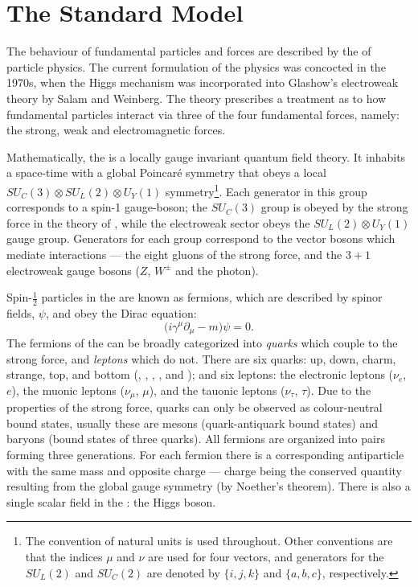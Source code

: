 \section{The Standard Model}
\label{sec:sm}
The behaviour of fundamental particles and forces are described by the \sm of
particle physics.
The current formulation of the \sm physics was concocted in the 1970s, when the Higgs
mechanism was incorporated into Glashow's electroweak theory by Salam and Weinberg.
The theory prescribes a treatment
as to how fundamental particles interact via three of the four
fundamental forces, namely: the strong, weak and electromagnetic forces.

Mathematically, the \sm is a locally gauge invariant quantum field theory.
It inhabits a space-time with a global Poincar\'e symmetry that obeys a local
$SU_C(3)\otimes SU_L(2)\otimes U_Y(1)$ symmetry\footnote{
The convention of natural units is used throughout.
Other conventions are that the indices $\mu$ and $\nu$ are used for four vectors, and generators
for the $SU_L(2)$ and $SU_C(2)$ are denoted by $\{i,j,k\}$ and $\{a,b,c\}$, respectively.}.
Each generator in this group corresponds to a spin-1 gauge-boson;
the $SU_C(3)$ group is obeyed by the strong force in the theory of \QCD,
while the electroweak sector obeys the $SU_L(2)\otimes U_Y(1)$ gauge group.
Generators for each group correspond to the vector bosons which mediate
interactions --- the eight gluons of the strong force, and the $3+1$ electroweak gauge bosons ($Z$,
$W^\pm$ and the photon).

Spin-$\tfrac12$ particles in the \sm are known as fermions,
which are described by spinor fields, $\psi$, and obey the Dirac equation:
\begin{equation}
  \big(i\gamma^\mu\partial_\mu - m\big)\psi = 0.
  \label{th:eq:dirac}
\end{equation}
The fermions of the \sm can be broadly categorized into \emph{quarks} which couple to the strong
force, and \emph{leptons} which do not.
There are six quarks: up, down, charm, strange, top, and bottom (\uquark, \dquark, \cquark,
\squark, \tquark and \bquark); and six leptons:
the electronic leptons ($\nu_e$, $e$),
the muonic leptons ($\nu_\mu$, $\mu$),
and the tauonic leptons ($\nu_\tau$, $\tau$).
Due to the properties of the strong force, quarks can only be observed as colour-neutral bound
states, usually these are
mesons (quark-antiquark bound states) and baryons (bound states of three quarks).
All fermions are organized into pairs forming three generations.
For each fermion there is a corresponding antiparticle with the same mass and opposite charge ---
charge being the conserved quantity resulting from the global gauge symmetry (by Noether's
theorem).
There is also a single scalar field in the \sm: the Higgs boson.

